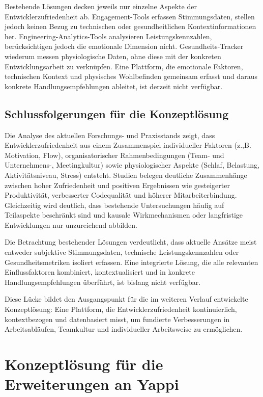 \documentclass[12pt,a4paper]{report}
\begin{document}
Bestehende Lösungen decken jeweils nur einzelne Aspekte der Entwicklerzufriedenheit ab. Engagement-Tools erfassen Stimmungsdaten,
stellen jedoch keinen Bezug zu technischen oder gesundheitlichen Kontextinformationen her. Engineering-Analytics-Tools analysieren
Leistungskennzahlen, berücksichtigen jedoch die emotionale Dimension nicht. Gesundheits-Tracker wiederum messen physiologische Daten,
ohne diese mit der konkreten Entwicklungsarbeit zu verknüpfen. Eine Plattform, die emotionale Faktoren, technischen Kontext und
physisches Wohlbefinden gemeinsam erfasst und daraus konkrete Handlungsempfehlungen ableitet, ist derzeit nicht verfügbar.

\section{Schlussfolgerungen für die Konzeptlösung}

Die Analyse des aktuellen Forschungs- und Praxisstands zeigt, dass Entwicklerzufriedenheit aus einem Zusammenspiel individueller
Faktoren (z.,B. Motivation, Flow), organisatorischer Rahmenbedingungen (Team- und Unternehmens-, Meetingkultur) sowie 
physiologischer Aspekte (Schlaf, Belastung, Aktivitätsniveau, Stress) entsteht. Studien belegen deutliche Zusammenhänge zwischen
hoher Zufriedenheit und positiven Ergebnissen wie gesteigerter Produktivität, verbesserter Codequalität und höherer
Mitarbeiterbindung. Gleichzeitig wird deutlich, dass bestehende Untersuchungen häufig auf Teilaspekte beschränkt sind und kausale
Wirkmechanismen oder langfristige Entwicklungen nur unzureichend abbilden.

Die Betrachtung bestehender Lösungen verdeutlicht, dass aktuelle Ansätze meist entweder subjektive Stimmungsdaten, technische
Leistungskennzahlen oder Gesundheitsmetriken isoliert erfassen. Eine integrierte Lösung, die alle relevanten Einflussfaktoren
kombiniert, kontextualisiert und in konkrete Handlungsempfehlungen überführt, ist bislang nicht verfügbar.

Diese Lücke bildet den Ausgangspunkt für die im weiteren Verlauf entwickelte Konzeptlösung: Eine Plattform, die
Entwicklerzufriedenheit kontinuierlich, kontextbezogen und datenbasiert misst, um fundierte Verbesserungen in Arbeitsabläufen,
Teamkultur und individueller Arbeitsweise zu ermöglichen.

\chapter{Konzeptlösung für die Erweiterungen an Yappi}
\end{document}
